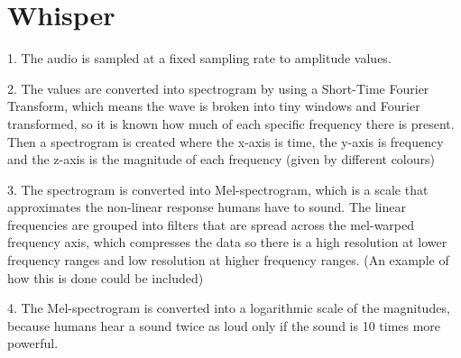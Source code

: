 \section{Whisper}
1. The audio is sampled at a fixed sampling rate to amplitude values.

2. The values are converted into spectrogram by using a Short-Time Fourier Transform, which means the wave is broken into tiny windows and Fourier transformed, so it is known how much of each specific frequency there is present. Then a spectrogram is created where the x-axis is time, the y-axis is frequency and the z-axis is the magnitude of each frequency (given by different colours)

3. The spectrogram is converted into Mel-spectrogram, which is a scale that approximates the non-linear response humans have to sound. The linear frequencies are grouped into filters that are spread across the mel-warped frequency axis, which compresses the data so there is a high resolution at lower frequency ranges and low resolution at higher frequency ranges. (An example of how this is done could be included)

4. The Mel-spectrogram is converted into a logarithmic scale of the magnitudes, because humans hear a sound twice as loud only if the sound is 10 times more powerful.
